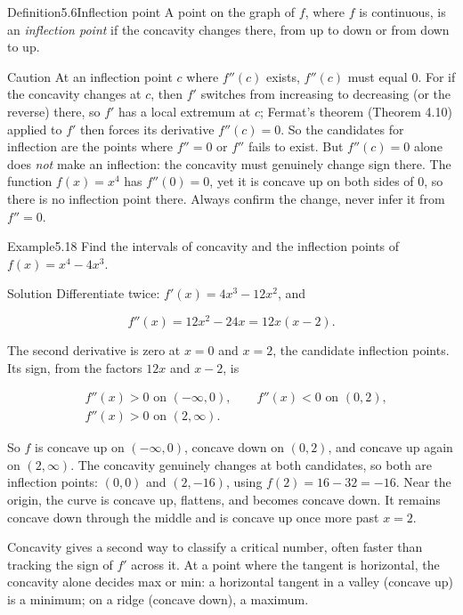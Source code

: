 \documentclass[a4paper,12pt,oneside]{memoir}
\begin{document}
\begin{envdefinition}{Definition}{5.6}{Inflection point}
A point on the graph of \(f\), where \(f\) is continuous, is an \emph{inflection point} if the concavity changes there, from up to down or from down to up.
\end{envdefinition}
\begin{envcaution}{Caution}{}{}
At an inflection point \(c\) where \(f''(c)\) exists, \(f''(c)\) must equal \(0\). For if the concavity changes at \(c\), then \(f'\) switches from increasing to decreasing (or the reverse) there, so \(f'\) has a local extremum at \(c\); Fermat’s theorem (Theorem 4.10) applied to \(f'\) then forces its derivative \(f''(c) = 0\). So the candidates for inflection are the points where \(f'' = 0\) or \(f''\) fails to exist. But \(f''(c) = 0\) alone does \emph{not} make an inflection: the concavity must genuinely change sign there. The function \(f(x) = x^{4}\) has \(f''(0) = 0\), yet it is concave up on both sides of \(0\), so there is no inflection point there. Always confirm the change, never infer it from \(f'' = 0\).
\end{envcaution}
\begin{workedexample}
\begin{envexample}{Example}{5.18}{}
Find the intervals of concavity and the inflection points of \(f(x) = x^{4} - 4x^{3}\).
\end{envexample}
\begin{envsolution}{Solution}{}{}
Differentiate twice: \(f'(x) = 4x^{3} - 12x^{2}\), and

\[ f''(x) = 12x^{2} - 24x = 12x(x - 2). \]

The second derivative is zero at \(x = 0\) and \(x = 2\), the candidate inflection points. Its sign, from the factors \(12x\) and \(x - 2\), is

\[ \begin{aligned}
          &f''(x) > 0 \text{ on } (-\infty, 0), \qquad f''(x) < 0 \text{ on } (0, 2), \\
          &f''(x) > 0 \text{ on } (2, \infty).
        \end{aligned} \]

So \(f\) is concave up on \((-\infty, 0)\), concave down on \((0, 2)\), and concave up again on \((2, \infty)\). The concavity genuinely changes at both candidates, so both are inflection points: \((0, 0)\) and \((2, -16)\), using \(f(2) = 16 - 32 = -16\). Near the origin, the curve is concave up, flattens, and becomes concave down. It remains concave down through the middle and is concave up once more past \(x = 2\). \qedmark
\end{envsolution}
\end{workedexample}
Concavity gives a second way to classify a critical number, often faster than tracking the sign of \(f'\) across it. At a point where the tangent is horizontal, the concavity alone decides max or min: a horizontal tangent in a valley (concave up) is a minimum; on a ridge (concave down), a maximum.
\end{document}
